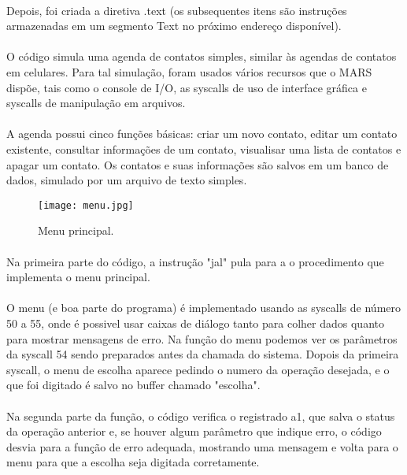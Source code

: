 \documentclass[12pt]{article}
\begin{document}
	\paragraph{}
	Depois, foi criada a diretiva .text (os subsequentes itens são instruções armazenadas em um segmento Text no próximo endereço disponível).
	\paragraph{}
	O código simula uma agenda de contatos simples, similar às agendas de contatos em celulares. Para tal simulação, foram usados vários recursos que o MARS dispõe, tais como o console de I/O, as syscalls de uso de interface gráfica e syscalls de manipulação em arquivos. 
	\paragraph{}
	A agenda possui cinco funções básicas: criar um novo contato, editar um contato existente, consultar informações de um contato, visualisar uma lista de contatos e apagar um contato. Os contatos e suas informações são salvos em um banco de dados, simulado por um arquivo de texto simples. 
	
\begin{figure}[h!]
    \texttt{[image: menu.jpg]}
    \caption{Menu principal.}
    \label{fig:menuprincipal}
\end{figure}	
	
	\paragraph{}
	Na primeira parte do código, a instrução "jal" pula para a o procedimento que implementa o menu principal.
	\paragraph{}
	O menu (e boa parte do programa) é implementado usando as syscalls de número 50 a 55, onde é possivel usar caixas de diálogo tanto para colher dados quanto para mostrar mensagens de erro. Na função do menu podemos ver os parâmetros da syscall 54 sendo preparados antes da chamada do sistema. Dopois da primeira syscall, o menu de escolha aparece pedindo o numero da operação desejada, e o que foi digitado é salvo no buffer chamado "escolha".
	\paragraph{}
	Na segunda parte da função, o código verifica o registrado a1, que salva o status da operação anterior e, se houver algum parâmetro que indique erro, o código desvia para a função de erro adequada, mostrando uma mensagem e volta para o menu para que a escolha seja digitada corretamente.
\end{document}
